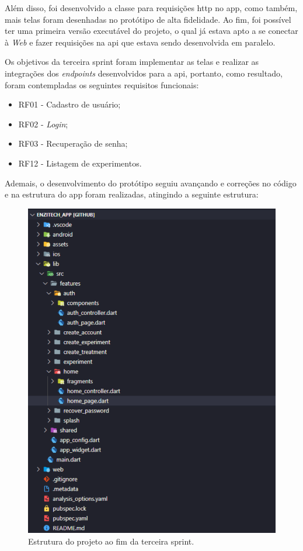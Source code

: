 Além disso, foi desenvolvido a classe para requisições \ac{http} no \ac{app}, como também, mais telas foram desenhadas no protótipo de alta fidelidade. Ao fim, foi possível ter uma primeira versão executável do projeto, o qual já estava apto a se conectar à \textit{Web} e fazer requisições na \ac{api} que estava sendo desenvolvida em paralelo. 

Os objetivos da terceira sprint foram implementar as telas e realizar as integrações dos \textit{endpoints} desenvolvidos para a \ac{api}, portanto, como resultado, foram contempladas os seguintes requisitos funcionais:
\begin{itemize}
   \item RF01 - Cadastro de usuário;
   \item RF02 - \textit{Login};
   \item RF03 - Recuperação de senha;
   \item RF12 - Listagem de experimentos.
 \end{itemize}

Ademais, o desenvolvimento do protótipo seguiu avançando e correções no código e na estrutura do \ac{app} foram realizadas, atingindo a seguinte estrutura:
\begin{figure}[H]
\centering
  \includegraphics[width=\columnwidth/2]{images/app_sprint_3.pdf}
  \caption{Estrutura do projeto ao fim da terceira sprint.}
  \label{fig:app_sprint_3}
\end{figure}


